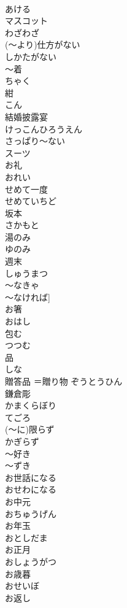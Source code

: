 \documentclass[8pt]{extreport}
\begin{document}
\begin{CJK}{UTF8}{min}
\\	あける
\\	マスコット	
\\	わざわざ	
\\	(～より)仕方がない	
\\	しかたがない
\\	～着	
\\	ちゃく
\\	紺	
\\	こん
\\	結婚披露宴	
\\	けっこんひろうえん
\\	さっぱり～ない	
\\	スーツ	
\\	お礼	
\\	おれい
\\	せめて一度	
\\	せめていちど
\\	坂本	
\\	さかもと
\\	湯のみ	
\\	ゆのみ
\\	週末	
\\	しゅうまつ
\\	～なきゃ	
\\	～なければ]	
\\	お箸	
\\	おはし
\\	包む	
\\	つつむ
\\	品	
\\	しな
\\	贈答品	＝贈り物	ぞうとうひん
\\	鎌倉彫	
\\	かまくらぼり
\\	てごろ	
\\	(～に)限らず	
\\	かぎらず
\\	～好き	
\\	～ずき
\\	お世話になる	
\\	おせわになる
\\	お中元	
\\	おちゅうげん
\\	お年玉	
\\	おとしだま
\\	お正月	
\\	おしょうがつ
\\	お歳暮	
\\	おせいぼ
\\	お返し	

\end{CJK}
\end{document}
